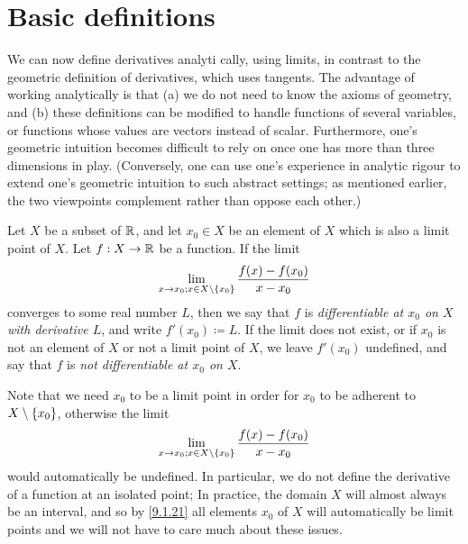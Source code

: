 \section{Basic definitions}\label{sec:10}

\begin{note}
  We can now define derivatives analyti cally, using limits, in contrast to the geometric definition of derivatives, which uses tangents.
  The advantage of working analytically is that
  (a) we do not need to know the axioms of geometry, and
  (b) these definitions can be modified to handle functions of several variables, or functions whose values are vectors instead of scalar.
  Furthermore, one's geometric intuition becomes difficult to rely on once one has more than three dimensions in play.
  (Conversely, one can use one's experience in analytic rigour to extend one's geometric intuition to such abstract settings;
  as mentioned earlier, the two viewpoints complement rather than oppose each other.)
\end{note}

\begin{defn}\label{10.1.1}
  Let \(X\) be a subset of \(\mathbb{R}\), and let \(x_0 \in X\) be an element of \(X\) which is also a limit point of \(X\).
  Let \(f : X \to \mathbb{R}\) be a function.
  If the limit
  \[
    \lim_{x \to x_0 ; x \in X \setminus \left\lbrace x_0\right\rbrace} \dfrac{f(x) - f(x_0)}{x - x_0}
  \]
  converges to some real number \(L\), then we say that \(f\) is \emph{differentiable at \(x_0\) on \(X\) with derivative \(L\)}, and write \(f'(x_0) \coloneqq L\).
  If the limit does not exist, or if \(x_0\) is not an element of \(X\) or not a limit point of \(X\), we leave \(f'(x_0)\) undefined, and say that \(f\) is \emph{not differentiable at \(x_0\) on \(X\)}.
\end{defn}

\begin{rmk}\label{10.1.2}
  Note that we need \(x_0\) to be a limit point in order for \(x_0\) to be adherent to \(X \setminus \left\lbrace x_0\right\rbrace\), otherwise the limit
  \[
    \lim_{x \to x_0 ; x \in X \setminus \left\lbrace x_0\right\rbrace} \dfrac{f(x) - f(x_0)}{x - x_0}
  \]
  would automatically be undefined.
  In particular, we do not define the derivative of a function at an isolated point;
  In practice, the domain \(X\) will almost always be an interval, and so by \cref{9.1.21} all elements \(x_0\) of \(X\) will automatically be limit points and we will not have to care much about these issues.
\end{rmk}

